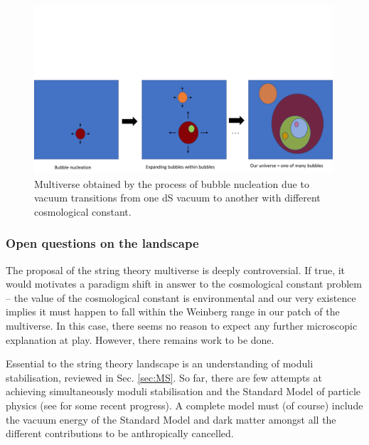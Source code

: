 \begin{figure}[ht]
    \centering
    \includegraphics[width = 0.99\textwidth]{Sections/Figures/Figure_Multiverse_3.pdf} 
    \caption{Multiverse obtained by the process of bubble nucleation due to vacuum transitions from one dS vacuum to another with different cosmological constant.}
    \label{fig:Multiverse}
\end{figure}

\subsubsection{Open questions on the landscape}

The proposal of the string theory multiverse is deeply controversial. If true, it would motivates a paradigm shift in answer to the cosmological constant problem -- the value of the cosmological constant is environmental and our very existence implies it must happen to fall within the Weinberg range in our patch of the multiverse. In this case, there seems no reason to expect any further microscopic explanation at play. However, there remains work to be done.

Essential to the string theory landscape is an understanding of moduli stabilisation, reviewed in Sec. \ref{sec:MS}. So far, there are few attempts at achieving simultaneously moduli stabilisation and the Standard Model of particle physics (see \cite{Cicoli:2021dhg} for some recent progress). A complete model must (of course) include the vacuum energy of the Standard Model and dark matter amongst all the different contributions to be anthropically cancelled. 

